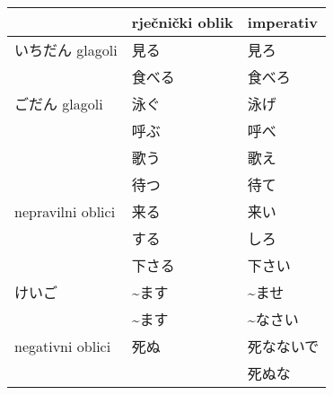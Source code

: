 	\newpage
		\begin{table}[h]
			\centering
			\begin{tabular}{l| l l}\toprule[2pt]
				& rječnički oblik & imperativ\\
				\midrule
				いちだん glagoli & 見る　& 見ろ\\
				& 食べる & 食べろ\\
				\midrule
				ごだん glagoli &泳ぐ & 泳げ\\
				& 呼ぶ  &  呼べ\\
				& 歌う  & 歌え\\
				& 待つ & 待て\\
				\midrule
				nepravilni oblici&来る & 来い\\
				& する & しろ\\
				& 下さる & 下さい\\
				\midrule
				けいご& \textasciitilde ます & \textasciitilde ませ\\
				& \textasciitilde ます & \textasciitilde なさい\\
				\midrule
				negativni oblici&死ぬ&死なないで\\
				&&死ぬな\\
				\bottomrule[2pt]
			\end{tabular}
		\end{table}
	
